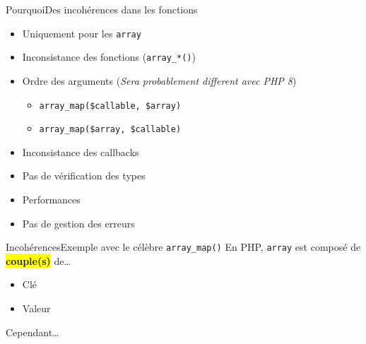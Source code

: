 \begin{frame}{Pourquoi}{Des incohérences dans les fonctions}
    \begin{itemize}[<+->]
        \item Uniquement pour les \texttt{array}
        \item Inconsistance des fonctions (\texttt{array\_*()})
        \item Ordre des arguments (\textit{Sera probablement different avec PHP 8})
        \begin{itemize}[<+->]
            \item \texttt{array\_map(\$callable, \$array)}
            \item \texttt{array\_map(\$array, \$callable)}
        \end{itemize}
        \item Inconsistance des callbacks
        \item Pas de vérification des types
        \item Performances
        \item Pas de gestion des erreurs
    \end{itemize}
\end{frame}

\begin{frame}{Incohérences}{Exemple avec le célèbre \texttt{array\_map()}}
    En PHP, \texttt{array} est composé de \colorbox{yellow}{\textbf{couple(s)}} de\ldots

    \begin{itemize}[<+->]
        \item<1-> Clé
        \item<2-> Valeur

    \end{itemize}
\end{frame}

\begin{frameC}{Cependant\ldots}

\end{frameC}

